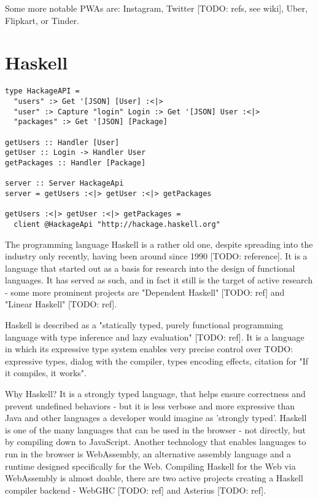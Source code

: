 \documentclass[english,odsaz]{fitthesis}
\begin{document}
Some more notable PWAs are: Instagram, Twitter [TODO: refs, see wiki], Uber,
Flipkart, or Tinder.

\section{Haskell}
\label{sec:org3fd22cc}
\begin{verbatim}
type HackageAPI =
  "users" :> Get '[JSON] [User] :<|>
  "user" :> Capture "login" Login :> Get '[JSON] User :<|>
  "packages" :> Get '[JSON] [Package]

getUsers :: Handler [User]
getUser :: Login -> Handler User
getPackages :: Handler [Package]

server :: Server HackageApi
server = getUsers :<|> getUser :<|> getPackages

getUsers :<|> getUser :<|> getPackages =
  client @HackageApi "http://hackage.haskell.org"
\end{verbatim}

The programming language Haskell is a rather old one, despite spreading into the
industry only recently, having been around since 1990 [TODO: reference]. It is a
language that started out as a basis for research into the design of functional
languages. It has served as such, and in fact it still is the target of active
research - some more prominent projects are "Dependent Haskell" [TODO: ref] and
"Linear Haskell" [TODO: ref].

Haskell is described as a "statically typed, purely functional programming
language with type inference and lazy evaluation" [TODO: ref]. It is a language
in which its expressive type system enables very precise control over TODO:
expressive types, dialog with the compiler, types encoding effects, citation for
"If it compiles, it works".

Why Haskell? It is a strongly typed language, that helps ensure correctness and
prevent undefined behaviors - but it is less verbose and more expressive than
Java and other languages a developer would imagine as 'strongly typed'. Haskell
is one of the many languages that can be used in the browser - not directly, but
by compiling down to JavaScript. Another technology that enables languages to
run in the browser is WebAssembly, an alternative assembly language and a
runtime designed specifically for the Web. Compiling Haskell for the Web via
WebAssembly is almost doable, there are two active projects creating a Haskell
compiler backend - WebGHC [TODO: ref] and Asterius [TODO: ref].
\end{document}

